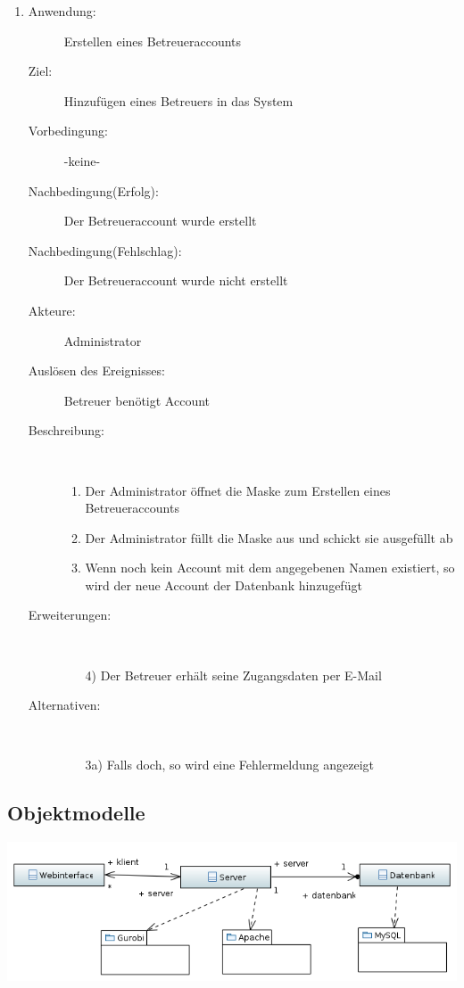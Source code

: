 \documentclass[parskip=full]{scrartcl}
\newcommand{\swtLabel}[1]{\textbf{/#1\arabic*0/}}
\begin{document}
\begin{enumerate} [label=\swtLabel{A}]
  
  \item
  \begin{description}
  \item[Anwendung:] Erstellen eines Betreueraccounts
  \item[Ziel:] Hinzufügen eines Betreuers in das System
  	\item[Vorbedingung:] -keine-
  	\item[Nachbedingung(Erfolg):] Der Betreueraccount wurde erstellt
  	\item[Nachbedingung(Fehlschlag):] Der Betreueraccount wurde nicht erstellt
  	\item[Akteure:] Administrator
  	\item[Auslösen des Ereignisses:] Betreuer benötigt Account
  	\item[Beschreibung:]~
  	 \begin{enumerate} 
  	   \item Der Administrator öffnet die Maske zum Erstellen eines
  	   Betreueraccounts  
  	   \item Der Administrator füllt die Maske aus und schickt sie ausgefüllt ab
  	   \item Wenn noch kein Account mit dem angegebenen Namen existiert, so wird
  	   der neue Account der Datenbank hinzugefügt
  	 \end{enumerate} 
  	\item[Erweiterungen:]~
  	 \begin{enumerate}
  	   \item[4)] Der Betreuer erhält seine Zugangsdaten per E-Mail
  	 \end{enumerate}  
  	\item[Alternativen:] ~
  	 \begin{enumerate}
  	  \item[3a)] Falls doch, so wird eine Fehlermeldung angezeigt
  	 \end{enumerate}  
  \end{description}
  
\end{enumerate}  
\subsection{Objektmodelle}

\includegraphics[width=\linewidth]{diagramme_pflichtenheft/ClassDiagram.PNG}
\end{document}
